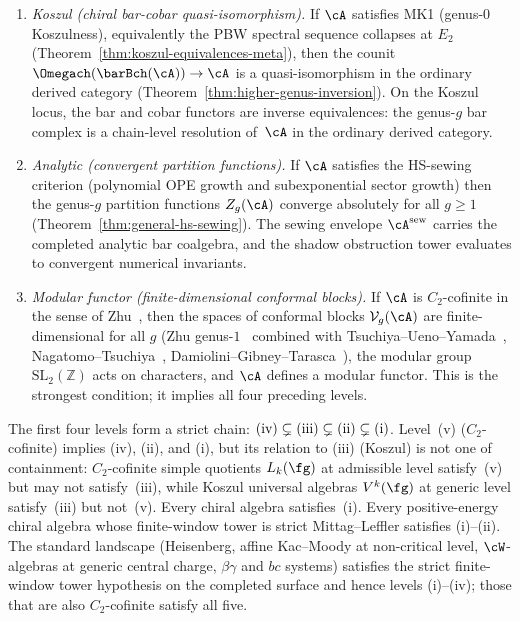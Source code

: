 \begin{theorem}
\begin{enumerate}[label=\textup{(\roman*)}]
\item \emph{Koszul \textup{(}chiral bar-cobar
 quasi-isomorphism\textup{)}.}\;
 If $\cA$ satisfies MK1 \textup{(}genus-$0$
 Koszulness\textup{)}, equivalently the PBW spectral sequence
 collapses at $E_2$
 \textup{(}Theorem~\textup{\ref{thm:koszul-equivalences-meta})},
 then the counit
 $\Omegach(\barBch(\cA)) \to \cA$ is a quasi-isomorphism
 in the ordinary derived category
 \textup{(}Theorem~\textup{\ref{thm:higher-genus-inversion})}.
 On the Koszul locus, the bar and cobar functors are
 inverse equivalences: the genus-$g$ bar complex is a
 chain-level resolution of~$\cA$ in the ordinary derived category.

\item \emph{Analytic \textup{(}convergent partition
 functions\textup{)}.}\;
 If $\cA$ satisfies the HS-sewing criterion (polynomial
 OPE growth and subexponential sector growth)
 then the genus-$g$ partition functions
 $Z_g(\cA)$ converge absolutely for all $g \geq 1$
 \textup{(}Theorem~\textup{\ref{thm:general-hs-sewing})}.
 The sewing envelope $\cA^{\mathrm{sew}}$ carries the
 completed analytic bar coalgebra, and the shadow
 obstruction tower evaluates to convergent numerical
 invariants.

\item \emph{Modular functor \textup{(}finite-dimensional
 conformal blocks\textup{)}.}\;
 If $\cA$ is $C_2$-cofinite in the sense of
 Zhu~\cite{Zhu96}, then the spaces of conformal blocks
 $\mathcal{V}_g(\cA)$ are finite-dimensional for all $g$
 (Zhu genus-$1$~\cite{Zhu96} combined with
 Tsuchiya--Ueno--Yamada~\cite{TUY89},
 Nagatomo--Tsuchiya~\cite{NagatomoTsuchiya05},
 Damiolini--Gibney--Tarasca~\cite{DGT21}),
 the modular group $\mathrm{SL}_2(\mathbb{Z})$ acts on
 characters, and $\cA$ defines a modular functor.
 This is the strongest condition; it implies all four
 preceding levels.
\end{enumerate}

The first four levels form a strict chain:
$\textup{(iv)} \subsetneq
\textup{(iii)} \subsetneq \textup{(ii)} \subsetneq
\textup{(i)}$.
Level~\textup{(v)} \textup{(}$C_2$-cofinite\textup{)} implies
\textup{(iv)}, \textup{(ii)}, and \textup{(i)}, but its
relation to \textup{(iii)} \textup{(}Koszul\textup{)} is not
one of containment: $C_2$-cofinite simple quotients
$L_k(\fg)$ at admissible level satisfy~\textup{(v)} but may
not satisfy~\textup{(iii)}, while Koszul universal algebras
$V^k(\fg)$ at generic level satisfy~\textup{(iii)} but
not~\textup{(v)}.
Every chiral algebra satisfies~\textup{(i)}.
Every positive-energy chiral algebra whose finite-window tower is
strict Mittag--Leffler satisfies \textup{(i)}--\textup{(ii)}.
The standard landscape \textup{(}Heisenberg, affine
Kac--Moody at non-critical level, $\cW$-algebras at
generic central charge, $\beta\gamma$ and $bc$
systems\textup{)} satisfies the strict finite-window tower hypothesis
on the completed surface and hence levels
\textup{(i)}--\textup{(iv)}; those that are also
$C_2$-cofinite satisfy all five.
\end{theorem}

